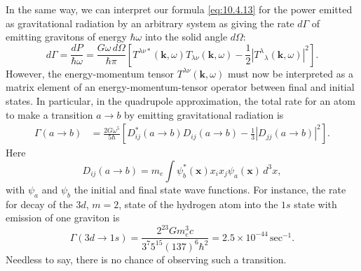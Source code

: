 In the same way, we can interpret our formula \eqref{eq:10.4.13} for the
power emitted as gravitational radiation by an arbitrary system as giving the
rate \(d\Gamma\) of emitting gravitons of energy \(\hbar\omega\) into the
solid angle \(d\Omega\):
\begin{equation}
  d\Gamma
  =
  \frac{dP}{\hbar\omega}
  =
  \frac{G\omega\,d\Omega}{\hbar\pi}
  \left[
    T^{\lambda\nu*}(\mathbf{k},\omega)
    T_{\lambda\nu}(\mathbf{k},\omega)
    -\frac12
    \left|T^\lambda{}_\lambda(\mathbf{k},\omega)\right|^2
  \right].
  \tag{10.8.5}\label{eq:10.8.5}
\end{equation}
However, the energy-momentum tensor \(T^{\lambda\nu}(\mathbf{k},\omega)\)
must now be interpreted as a matrix element of an energy-momentum-tensor
operator between final and initial states. In particular, in the quadrupole
approximation, the total rate for an atom to make a transition \(a\to b\)
by emitting gravitational radiation is
\begin{equation}
  \begin{split}
  \Gamma(a\to b)
  &=
  \frac{2G\omega^5}{5\hbar}
  \left[
    D_{ij}^*(a\to b)D_{ij}(a\to b)
    -\frac13\left|D_{jj}(a\to b)\right|^2
  \right].
  \end{split}
  \tag{10.8.6}\label{eq:10.8.6}
\end{equation}
Here
\begin{equation}
  D_{ij}(a\to b)
  =
  m_e\int
  \psi_b^*(\mathbf{x})x_i x_j\psi_a(\mathbf{x})\,d^3x,
  \tag{10.8.7}\label{eq:10.8.7}
\end{equation}
with \(\psi_a\) and \(\psi_b\) the initial and final state wave functions.
For instance, the rate for decay of the \(3d\), \(m=2\), state of the
hydrogen atom into the \(1s\) state with emission of one graviton is
\[
  \Gamma(3d\to1s)
  =
  \frac{2^{23}Gm_e^3c}
       {3^7 5^{15}(137)^6\hbar^2}
  =
  2.5\times10^{-44}\,\mathrm{sec^{-1}}.
\]
Needless to say, there is no chance of observing such a transition.

